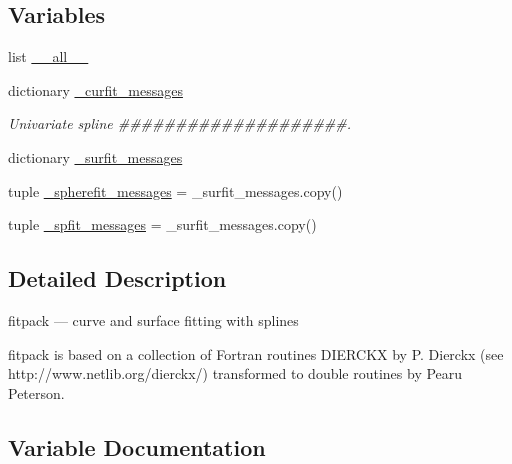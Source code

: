 \subsection*{Variables}
\begin{DoxyCompactItemize}
\item 
list \hyperlink{namespacescipy_1_1interpolate_1_1fitpack2_a3a63deac09f4132e40e857c38fcef3fa}{\+\_\+\+\_\+all\+\_\+\+\_\+}
\item 
dictionary \hyperlink{namespacescipy_1_1interpolate_1_1fitpack2_aab995026c3e8606b3c472a654ae21960}{\+\_\+curfit\+\_\+messages}
\begin{DoxyCompactList}\small\item\em Univariate spline \#\#\#\#\#\#\#\#\#\#\#\#\#\#\#\#\#\#\#\#. \end{DoxyCompactList}\item 
dictionary \hyperlink{namespacescipy_1_1interpolate_1_1fitpack2_ab197deef0ee75808b311245ee95464b9}{\+\_\+surfit\+\_\+messages}
\item 
tuple \hyperlink{namespacescipy_1_1interpolate_1_1fitpack2_a7b9b6ca290bc4a32d87bcbedf98701c6}{\+\_\+spherefit\+\_\+messages} = \+\_\+surfit\+\_\+messages.\+copy()
\item 
tuple \hyperlink{namespacescipy_1_1interpolate_1_1fitpack2_a124201a8b539a967417ab60fbd2a0822}{\+\_\+spfit\+\_\+messages} = \+\_\+surfit\+\_\+messages.\+copy()
\end{DoxyCompactItemize}


\subsection{Detailed Description}
\begin{DoxyVerb}fitpack --- curve and surface fitting with splines

fitpack is based on a collection of Fortran routines DIERCKX
by P. Dierckx (see http://www.netlib.org/dierckx/) transformed
to double routines by Pearu Peterson.
\end{DoxyVerb}
 

\subsection{Variable Documentation}
\hypertarget{namespacescipy_1_1interpolate_1_1fitpack2_a3a63deac09f4132e40e857c38fcef3fa}{}

